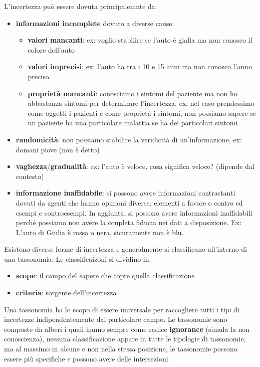 L'incertezza può essere dovuta principalemnte da:
\begin{itemize}
    \item \textbf{informazioni incomplete} dovuto a diverse cause:
    \begin{itemize}
        \item \textbf{valori mancanti}: ex: voglio stabilire se l'auto è gialla ma
        non conosco il colore dell'auto
        \item \textbf{valori imprecisi}: ex: l'auto ha tra i 10 e 15 anni ma non 
        conosco l'anno preciso
        \item \textbf{proprietà mancanti}: conosciamo i sintomi del paziente ma non 
        ho abbastanza sintomi per determinare l'incertezza. ex: nel caso prendessimo come oggetti i
        pazienti e come proprietà i sintomi, non possiamo sapere se un paziente 
        ha una particolare malattia se ha dei particolari sintomi.
    \end{itemize}
    \item \textbf{randomicità}: non possiamo stabilire la 
    veridicità di un'informazione, ex: domani piove (non è detto)
    \item  \textbf{vaghezza}/\textbf{gradualità}: ex: l'auto è veloce, cosa significa veloce?
    (dipende dal contesto)
    \item \textbf{informazione inaffidabile}: si possono avere informazioni
    contrastanti dovuti da agenti che hanno opinioni diverse, elementi a favore
    o contro ed esempi e controesempi. In aggiunta, si possono avere informazioni
    inaffidabili perché possiamo non avere la conpleta fiducia nei dati a disposizione.
    Ex: L'auto di Giulia è rossa o nera, sicuramente non è blu.
\end{itemize}

Esistono diverse forme di incertezza e generalmente si classificano all'interno
di una tassonomia. Le classificaizoni si dividino in:
\begin{itemize}
    \item \textbf{scope}: il campo del sapere che copre quella classificazione
    \item \textbf{criteria}: sorgente dell'incertezza
\end{itemize}

Una tassonomia ha lo scopo di essere universale per raccogliere tutti i tipi di
incertezze indipendentemente dal particolare campo. Le tassonomie sono composte
da alberi i quali hanno sempre come radice \textbf{ignorance} (simula la non conoscienza),
nessuna classificazione appare in tutte le tipologie di tassonomie, ma al massimo in alcune e non 
nella stessa posizione, le tassonomie possono essere più specifiche e possono avere delle intersezioni.

